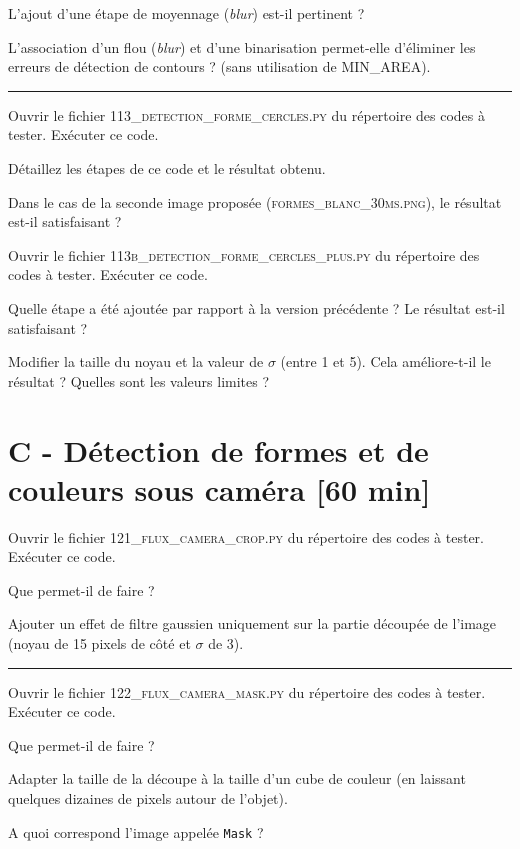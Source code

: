 \documentclass[a4paper,12pt,titlepage]{article} %
\begin{document}
\Quest L'ajout d'une étape de moyennage (\textit{blur}) est-il pertinent ?

\Quest L'association d'un flou (\textit{blur}) et d'une binarisation permet-elle d'éliminer les erreurs de détection de contours ? (sans utilisation de \textsc{MIN\_AREA}).

\noindent \rule{\linewidth}{1pt}

\Manip Ouvrir le fichier \textsc{113\_detection\_forme\_cercles.py} du répertoire des codes à tester. Exécuter ce code.

\Quest Détaillez les étapes de ce code et le résultat obtenu.

\Quest Dans le cas de la seconde image proposée (\textsc{formes\_blanc\_30ms.png}), le résultat est-il satisfaisant ? 

\Manip Ouvrir le fichier \textsc{113b\_detection\_forme\_cercles\_plus.py} du répertoire des codes à tester. Exécuter ce code.

\Quest Quelle étape a été ajoutée par rapport à la version précédente ? Le résultat est-il satisfaisant ?

\Manip Modifier la taille du noyau et la valeur de $\sigma$ (entre 1 et 5). Cela améliore-t-il le résultat ? Quelles sont les valeurs limites ? 


\newpage
\section{C - Détection de formes et de couleurs sous caméra {[60 min]}}

\Manip Ouvrir le fichier \textsc{121\_flux\_camera\_crop.py} du répertoire des codes à tester. Exécuter ce code.

\Quest Que permet-il de faire ?

\Manip Ajouter un effet de filtre gaussien uniquement sur la partie découpée de l'image (noyau de 15 pixels de côté et $\sigma$ de 3).

\noindent \rule{\linewidth}{1pt}

\Manip Ouvrir le fichier \textsc{122\_flux\_camera\_mask.py} du répertoire des codes à tester. Exécuter ce code.

\Quest Que permet-il de faire ?

\Manip Adapter la taille de la découpe à la taille d'un cube de couleur (en laissant quelques dizaines de pixels autour de l'objet).

\Quest A quoi correspond l'image appelée \texttt{Mask} ?
\end{document}
